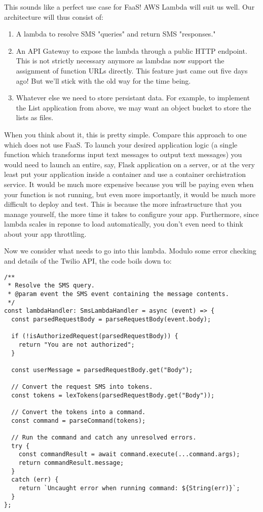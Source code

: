 \documentclass{article}
\begin{document}
This sounds like a perfect use case for FaaS!
AWS Lambda will suit us well.
Our architecture will thus consist of:

\begin{enumerate}
  \item A lambda to resolve SMS "queries" and return SMS "responses."
  \item An API Gateway to expose the lambda through a public HTTP endpoint. This is not strictly necessary anymore as lambdas now support the assignment of function URLs directly. This feature just came out five days ago! But we'll stick with the old way for the time being.
  \item Whatever else we need to store persistant data.
    For example, to implement the List application from above, we may want an object bucket to store the lists as files.
\end{enumerate}

When you think about it, this is pretty simple.
Compare this approach to one which does not use FaaS.
To launch your desired application logic (a single function which transforms input text messages to output text messages) you would need to launch an entire, say, Flask application on a server, or at the very least put your application inside a container and use a container orchistration service.
It would be much more expensive because you will be paying even when your function is not running, but even more importantly, it would be much more difficult to deploy and test.
This is because the more infrastructure that you manage yourself, the more time it takes to configure your app.
Furthermore, since lambda scales in reponse to load automatically, you don't even need to think about your app throttling.

Now we consider what needs to go into this lambda.
Modulo some error checking and details of the Twilio API, the code boils down to:

\begin{verbatim}
/**
 * Resolve the SMS query.
 * @param event the SMS event containing the message contents.
 */
const lambdaHandler: SmsLambdaHandler = async (event) => {
  const parsedRequestBody = parseRequestBody(event.body);

  if (!isAuthorizedRequest(parsedRequestBody)) {
    return "You are not authorized";
  }

  const userMessage = parsedRequestBody.get("Body");

  // Convert the request SMS into tokens.
  const tokens = lexTokens(parsedRequestBody.get("Body"));

  // Convert the tokens into a command.
  const command = parseCommand(tokens);

  // Run the command and catch any unresolved errors.
  try {
    const commandResult = await command.execute(...command.args);
    return commandResult.message;
  }
  catch (err) {
    return `Uncaught error when running command: ${String(err)}`;
  }
};
\end{verbatim}
\end{document}

